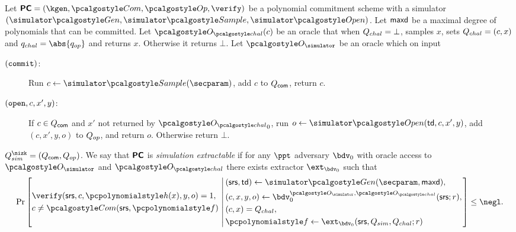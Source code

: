 \documentclass[runningheads,11pt]{llncs}
\begin{document}
\begin{definition}
  \label{def:se_bdv0}
  Let $\PCOM = (\kgen, \com, \op, \verify)$ be a polynomial commitment scheme with a
  simulator $(\simgen, \simsample, \simopen)$. Let $\mathsf{maxd}$ be a maximal degree of
  polynomials that can be committed. Let $\oraclec (c)$ be an oracle that when
  ${Q_{chal}} = \bot$, samples $x$, sets ${Q_{chal}} = (c, x)$ and $\qchal = \abs{\qop}$ and
    returns $x$. Otherwise it returns $\bot$. Let $\oracles$ be an oracle which on
    input
     \begin{description}
     \item[$(\mathtt{commit})$:] Run $c \gets \simsample (\secparam)$, add $c$ to
       $Q_{\mathsf{com}}$, return $c$.
     \item[$(\mathtt{open}, c, x', y)$:] If $c \in Q_{\mathsf{com}}$ and $x'$ not returned by $\oraclec_0$, run
       $o \gets \simopen(\td, c, x', y)$, add $(c, x', y, o)$ to $Q_{op}$, and return
       $o$. Otherwise return $\bot$. 
     \end{description}
     $\Qsim = (\Qcom, \Qop)$.  We say that $\bm{\mathsf{PC}}$ is \emph{simulation
       extractable} if for any $\ppt$ adversary $\bdv_0$ with oracle access to
     $\oracles$ and $\oraclec$ there exists extractor $\ext_{\bdv_0}$ such that
     \[
       \Pr \left[
         \begin{aligned}
           & \verify(\srs, c, \ph{x}, y, o) = 1, \\
           & c \neq \com(\srs, \p{f})\\
         \end{aligned}
         \,\left|\, \vphantom{
             \begin{aligned}
               & \\
               & \\
               & \\
               &
             \end{aligned}
           }
           \begin{aligned}
             & (\srs, \td) \gets \simgen(\secparam, \maxdeg),\\
             & (c, x, y, o) \gets \bdv_0^{\oracles,\oraclec}(\srs; r), \\
             & (c, x) = \Qchal, \\
             & \p{f} \gets \ext_{\bdv_0}(\srs, Q_{sim}, Q_{chal}; r)
           \end{aligned}
         \right.\right] \leq \negl.
     \]
\end{definition}
\end{document}
